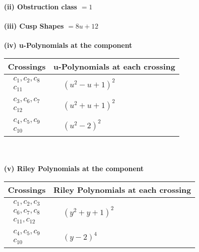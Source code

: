 \documentclass[1p]{elsarticle_modified}
\theoremstyle{definition}
\begin{document}
\flushleft \textbf{(ii) Obstruction class $= 1$}\\~\\
\flushleft \textbf{(iii) Cusp Shapes $= 8 u+12$}\\~\\
\newpage\renewcommand{\arraystretch}{1}
\flushleft \textbf{(iv) u-Polynomials at the component}\newline \\
\begin{tabular}{m{50pt}|m{274pt}}
Crossings & \hspace{64pt}u-Polynomials at each crossing \\
\hline $$\begin{aligned}c_{1},c_{2},c_{8}\\c_{11}\end{aligned}$$&$\begin{aligned}
&(u^2- u+1)^2
\end{aligned}$\\
\hline $$\begin{aligned}c_{3},c_{6},c_{7}\\c_{12}\end{aligned}$$&$\begin{aligned}
&(u^2+u+1)^2
\end{aligned}$\\
\hline $$\begin{aligned}c_{4},c_{5},c_{9}\\c_{10}\end{aligned}$$&$\begin{aligned}
&(u^2-2)^2
\end{aligned}$\\
\hline
\end{tabular}\\~\\
\newpage\renewcommand{\arraystretch}{1}
\flushleft \textbf{(v) Riley Polynomials at the component}\newline \\
\begin{tabular}{m{50pt}|m{274pt}}
Crossings & \hspace{64pt}Riley Polynomials at each crossing \\
\hline $$\begin{aligned}c_{1},c_{2},c_{3}\\c_{6},c_{7},c_{8}\\c_{11},c_{12}\end{aligned}$$&$\begin{aligned}
&(y^2+y+1)^2
\end{aligned}$\\
\hline $$\begin{aligned}c_{4},c_{5},c_{9}\\c_{10}\end{aligned}$$&$\begin{aligned}
&(y-2)^4
\end{aligned}$\\
\hline
\end{tabular}\\~\\
\end{document}
